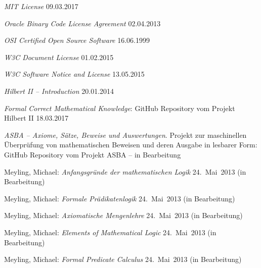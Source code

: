 \begin{flushleft}
\begin{thebibliography}{12}
		\emph{MIT License}
		09.03.2017

		\emph{Oracle Binary Code License Agreement}
		02.04.2013

		\emph{OSI Certified Open Source Software}
		16.06.1999

		\emph{W3C Document License}
		01.02.2015

		\emph{W3C Software Notice and License}
		13.05.2015

		\emph{Hilbert II -- Introduction}
		20.01.2014

		\emph{Formal Correct Mathematical Knowledge}:
		GitHub Repository vom Projekt Hilbert II
		18.03.2017

		\emph{ASBA -- Axiome, Sätze, Beweise und Auswertungen}.
		Projekt zur maschinellen Überprüfung von mathematischen Beweisen
		und deren Ausgabe in lesbarer Form:
		GitHub Repository vom Projekt ASBA
		-- in Bearbeitung

		Meyling, Michael:
		\emph{Anfangsgründe der mathematischen Logik}
		24.~Mai~2013 (in Bearbeitung)

		Meyling, Michael:
		\emph{Formale Prädikatenlogik}
		24.~Mai~2013 (in Bearbeitung)

		Meyling, Michael:
		\emph{Axiomatische Mengenlehre}
		24.~Mai~2013 (in Bearbeitung)

		Meyling, Michael:
		\emph{Elements of Mathematical Logic}
		24.~Mai~2013 (in Bearbeitung)

		Meyling, Michael:
		\emph{Formal Predicate Calculus}
		24.~Mai~2013 (in Bearbeitung)


\end{thebibliography}
\end{flushleft}
